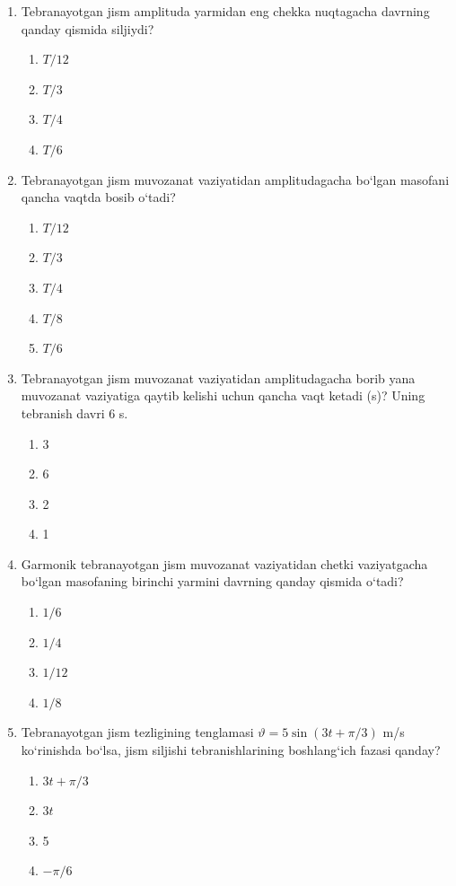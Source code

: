 \begin{enumerate}
\item Tebranayotgan jism amplituda yarmidan eng chekka nuqtagacha davrning qanday qismida siljiydi?
\begin{enumerate}[label=\Alph*)]
\item $T/12$
\item $T/3$
\item $T/4$
\item $T/6$
\end{enumerate}

\item Tebranayotgan jism muvozanat vaziyatidan amplitudagacha bo‘lgan masofani qancha vaqtda bosib o‘tadi?
\begin{enumerate}[label=\Alph*)]
\item $T/12$
\item $T/3$
\item $T/4$
\item $T/8$
\item $T/6$
\end{enumerate}

\item Tebranayotgan jism muvozanat vaziyatidan amplitudagacha borib yana muvozanat vaziyatiga qaytib kelishi uchun qancha vaqt ketadi (s)? Uning tebranish davri 6 s.
\begin{enumerate}[label=\Alph*)]
\item 3
\item 6
\item 2
\item 1
\end{enumerate}

\item Garmonik tebranayotgan jism muvozanat vaziyatidan chetki vaziyatgacha bo‘lgan masofaning birinchi yarmini davrning qanday qismida o‘tadi?
\begin{enumerate}[label=\Alph*)]
\item $1/6$
\item $1/4$
\item $1/12$
\item $1/8$
\end{enumerate}

\item Tebranayotgan jism tezligining tenglamasi $\vartheta = 5 \sin(3t + \pi/3)$ m/s ko‘rinishda bo‘lsa, jism siljishi tebranishlarining boshlang‘ich fazasi qanday?
\begin{enumerate}[label=\Alph*)]
\item $3t + \pi/3$
\item $3t$
\item 5
\item $-\pi/6$
\end{enumerate}


\end{enumerate}
